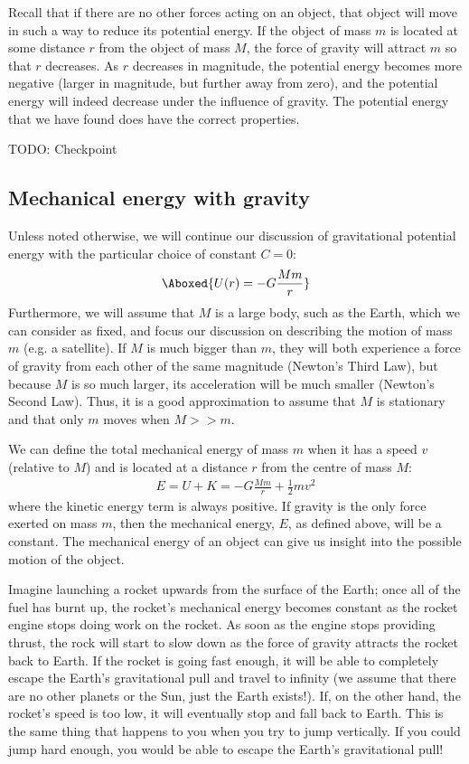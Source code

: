 Recall that if there are no other forces acting on an object, that object will move in such a way to reduce its potential energy. If the object of mass $m$ is located at some distance $r$ from the object of mass $M$, the force of gravity will attract $m$ so that $r$ decreases. As $r$ decreases in magnitude, the potential energy becomes more negative (larger in magnitude, but further away from zero), and the potential energy will indeed decrease under the influence of gravity. The potential energy that we have found does have the correct properties.

TODO: Checkpoint

\subsection{Mechanical energy with gravity}
Unless noted otherwise, we will continue our discussion of gravitational potential energy with the particular choice of constant $C=0$:
\begin{align}
\Aboxed{U(r) = -G\frac{Mm}{r}}
\end{align}
Furthermore, we will assume that $M$ is a large body, such as the Earth, which we can consider as fixed, and focus our discussion on describing the motion of mass $m$ (e.g. a satellite). If $M$ is much bigger than $m$, they will both experience a force of gravity from each other of the same magnitude (Newton's Third Law), but because $M$ is so much larger, its acceleration will be much smaller (Newton's Second Law). Thus, it is a good approximation to assume that $M$ is stationary and that only $m$ moves when $M>>m$. 

We can define the total mechanical energy of mass $m$ when it has a speed $v$ (relative to $M$) and is located at a distance $r$ from the centre of mass $M$:
\begin{align*}
E = U + K = -G\frac{Mm}{r}+\frac{1}{2}mv^2
\end{align*}
where the kinetic energy term is always positive. If gravity is the only force exerted on mass $m$, then the mechanical energy, $E$, as defined above, will be a constant. The mechanical energy of an object can give us insight into the possible motion of the object.

Imagine launching a rocket upwards from the surface of the Earth; once all of the fuel has burnt up, the rocket's mechanical energy becomes constant as the rocket engine stops doing work on the rocket. As soon as the engine stops providing thrust, the rock will start to slow down as the force of gravity attracts the rocket back to Earth. If the rocket is going fast enough, it will be able to completely escape the Earth's gravitational pull and travel to infinity (we assume that there are no other planets or the Sun, just the Earth exists!). If, on the other hand, the rocket's speed is too low, it will eventually stop and fall back to Earth. This is the same thing that happens to you when you try to jump vertically. If you could jump hard enough, you would be able to escape the Earth's gravitational pull!

